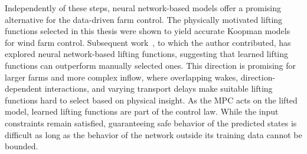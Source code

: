 Independently of these steps, neural network-based models offer a promising alternative for the data-driven farm control. The physically motivated lifting functions selected in this thesis were shown to yield accurate Koopman models for wind farm control. Subsequent work~\cite{sharan2024autoencoder, sharan2026tcn}, to which the author contributed, has explored neural network-based lifting functions, suggesting that learned lifting functions can outperform manually selected ones. This direction is promising for larger farms and more complex inflow, where overlapping wakes, direction-dependent interactions, and varying transport delays make suitable lifting functions hard to select based on physical insight. As the MPC acts on the lifted model, learned lifting functions are part of the control law. While the input constraints remain satisfied, guaranteeing safe behavior of the predicted states is difficult as long as the behavior of the network outside its training data cannot be bounded.

